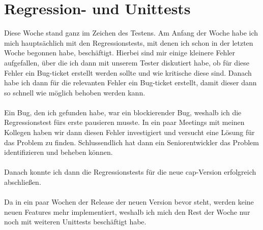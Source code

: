 \section{Regression- und Unittests}
Diese Woche stand ganz im Zeichen des Testens. Am Anfang der Woche habe ich mich hauptsächlich mit den Regressionstests, mit denen ich schon in der letzten Woche begonnen habe, beschäftigt. Hierbei sind mir einige kleinere Fehler aufgefallen, über die ich dann mit unserem Tester diskutiert habe, ob für diese Fehler ein Bug-ticket erstellt werden sollte und wie kritische diese sind. Danach habe ich dann für die relevanten Fehler ein Bug-ticket erstellt, damit dieser dann so schnell wie möglich behoben werden kann. \\\\
Ein Bug, den ich gefunden habe, war ein blockierender Bug, weshalb ich die Regressionstest fürs erste pausieren musste. In ein paar Meetings mit meinen Kollegen haben wir dann diesen Fehler investigiert und versucht eine Lösung für das Problem zu finden. Schlussendlich hat dann ein Seniorentwickler das Problem identifizieren und beheben können. \\\\
Danach konnte ich dann die Regressionstests für die neue \gls{cap}-Version erfolgreich abschließen. \\\\
Da in ein paar Wochen der Release der neuen Version bevor steht, werden keine neuen Features mehr implementiert, weshalb ich mich den Rest der Woche nur noch mit weiteren Unittests beschäftigt habe. \\\\

